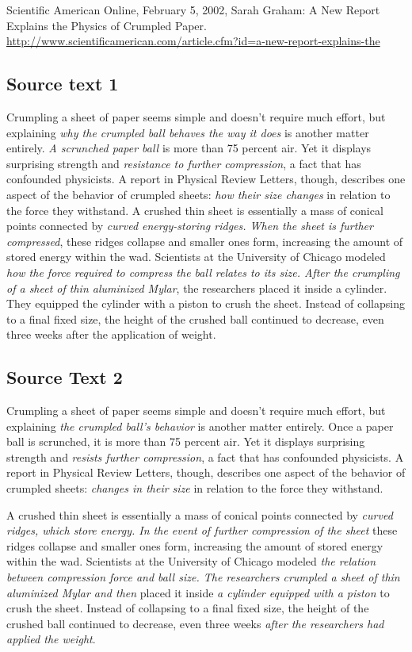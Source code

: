 \documentclass[output=paper]{LSP/langsci}
\begin{document}
Scientific American Online, February 5, 2002, Sarah Graham: A New Report Explains the Physics of Crumpled Paper. \url{http://www.scientificamerican.com/article.cfm?id=a-new-report-explains-the}

\subsection{Source text 1}
Crumpling a sheet of paper seems simple and doesn't require much effort, but explaining \textit{why the crumpled ball behaves the way it does} is another matter entirely. \textit{A scrunched paper ball} is more than 75 percent air. Yet it displays surprising strength and \textit{resistance to further compression}, a fact that has confounded physicists. A report in Physical Review Letters, though, describes one aspect of the behavior of crumpled sheets: \textit{how their size changes} in relation to the force they withstand.
A crushed thin sheet is essentially a mass of conical points connected by \textit{curved energy-storing ridges. When the sheet is further compressed}, these ridges collapse and smaller ones form, increasing the amount of stored energy within the wad. Scientists at the University of Chicago modeled \textit{how the force required to compress the ball relates to its size. After the crumpling of a sheet of thin aluminized Mylar}, the researchers placed it inside a cylinder. They equipped the cylinder with a piston to crush the sheet. Instead of collapsing to a final fixed size, the height of the crushed ball continued to decrease, even three weeks after the application of weight.

\subsection{Source Text 2}
Crumpling a sheet of paper seems simple and doesn't require much effort, but explaining \textit{the crumpled ball’s behavior} is another matter entirely. Once a paper ball is scrunched, it is more than 75 percent air. Yet it displays surprising strength and \textit{resists further compression}, a fact that has confounded physicists. A report in Physical Review Letters, though, describes one aspect of the behavior of crumpled sheets: \textit{changes in their size} in relation to the force they withstand.

A crushed thin sheet is essentially a mass of conical points connected by \textit{curved ridges, which store energy. In the event of further compression of the sheet} these ridges collapse and smaller ones form, increasing the amount of stored energy within the wad. Scientists at the University of Chicago modeled \textit{the relation between compression force and ball size. The researchers crumpled a sheet of thin aluminized Mylar and then} placed it inside \textit{a cylinder equipped with a piston} to crush the sheet. Instead of collapsing to a final fixed size, the height of the crushed ball continued to decrease, even three weeks \textit{after the researchers had applied the weight}.

\printbibliography[heading=subbibliography,notkeyword=this]
\end{document}
